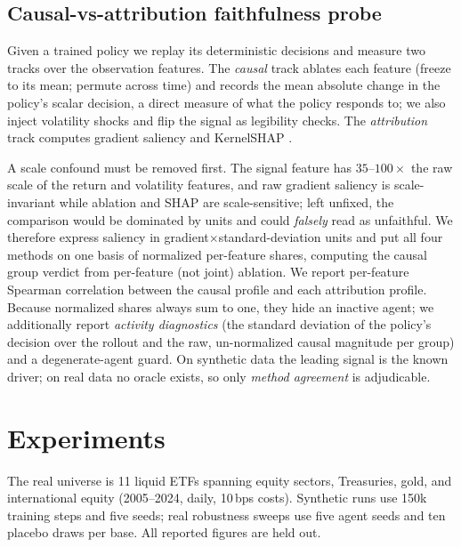 \documentclass[sigconf,anonymous,review]{acmart}
\begin{document}
\subsection{Causal-vs-attribution faithfulness probe}
Given a trained policy we replay its deterministic decisions and measure two tracks
over the observation features. The \emph{causal} track ablates each feature (freeze
to its mean; permute across time) and records the mean absolute change in the
policy's scalar decision, a direct measure of what the policy responds to; we also
inject volatility shocks and flip the signal as legibility checks. The
\emph{attribution} track computes gradient saliency \cite{simonyan2014} and
KernelSHAP \cite{lundberg2017}.

A scale confound must be removed first. The signal feature has $35$--$100\times$ the
raw scale of the return and volatility features, and raw gradient saliency is
scale-invariant while ablation and SHAP are scale-sensitive; left unfixed, the
comparison would be dominated by units and could \emph{falsely} read as unfaithful.
We therefore express saliency in gradient$\times$standard-deviation units and put all
four methods on one basis of normalized per-feature shares, computing the causal
group verdict from per-feature (not joint) ablation. We report per-feature Spearman
correlation between the causal profile and each attribution profile. Because
normalized shares always sum to one, they hide an inactive agent; we additionally
report \emph{activity diagnostics} (the standard deviation of the policy's decision
over the rollout and the raw, un-normalized causal magnitude per group) and a
degenerate-agent guard. On synthetic data the leading signal is the known driver; on
real data no oracle exists, so only \emph{method agreement} is adjudicable.

\section{Experiments}
The real universe is 11 liquid ETFs spanning equity sectors, Treasuries, gold, and
international equity (2005--2024, daily, 10\,bps costs). Synthetic runs use 150k
training steps and five seeds; real robustness sweeps use five agent seeds and ten
placebo draws per base. All reported figures are held out.
\end{document}

